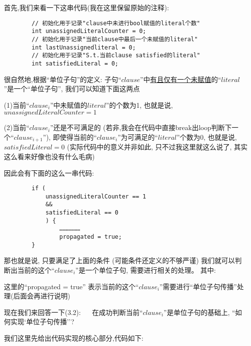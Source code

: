         首先,我们来看一下这串代码(我在这里保留原始的注释):
        \begin{lstlisting}
        // 初始化用于记录"clause中未进行bool赋值的literal个数" 
        int unassignedLiteralCounter = 0;
        // 初始化用于记录"当前clause中最后一个未赋值的literal"
        int lastUnassignedliteral = 0;
        // 初始化用于记录"S.t.当前clause satisfied的literal"
        int satisfiedLiteral = 0;
        \end{lstlisting}
        \par
        很自然地,根据``单位子句''的定义:
        子句``$clause$''中\underline{有且仅有一个未赋值}的``$literal$''是一个``单位子句'',
        我们可以知道下面这两点
        \par
        (1)当前``$clause_{i}$''中未赋值的$literal$''的个数为1,
        也就是说,
        $unassignedLiteralCounter=1$
        \par
        (2)当前``$clause_{i}$''还是不可满足的
        (若非,我会在代码中直接break出loop判断下一个``$clause_{i+1}$''),
        即使得当前的``$clause_{i}$''为可满足的``$literal$''个数为0,
        也就是说,
        $satisfiedLiteral=0$
        (实际代码中的意义并非如此,
        只不过我这里就这么说了,
        其实这么看来好像也没有什么毛病)
        \par
        因此会有下面的这么一串代码:
        \begin{lstlisting}
        if (
            unassignedLiteralCounter == 1 
            && 
            satisfiedLiteral == 0
            ) {
                ………………
                propagated = true;
        }
        \end{lstlisting}
        \par
        那也就是说,
        只要满足了上面的条件
        (可能条件还定义的不够严谨)
        我们就可以判断出当前的这个``$clause_{i}$''是一个单位子句,
        需要进行相关的处理。
        \newline
        \newline
        其中:
        \par
        这里的``propagated = true''
        表示当前的这个``$clause_{i}$''需要进行``单位子句传播''处理(后面会再进行说明)
        \newline
        \par
        现在我们来回答一下(3.2):
        $\quad$ 在成功判断当前``$clause_{i}$''是单位子句的基础上,
        ``如何实现`单位子句传播''?
        \newline
        \par
        我们这里先给出代码实现的核心部分,代码如下:
